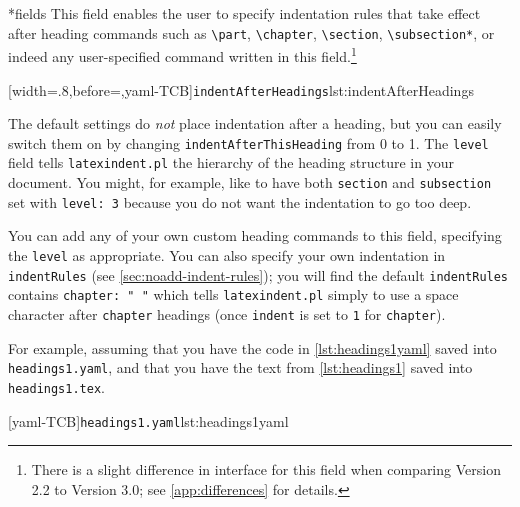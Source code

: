 *{fields}
	This field enables the user to specify indentation rules that take effect after heading
	commands such as \lstinline!\part!, \lstinline!\chapter!,
	\lstinline!\section!, \lstinline!\subsection*!, or indeed any user-specified command
	written in this field.\footnote{There is a slight difference in interface for this field
		when comparing Version 2.2 to Version 3.0; see \vref{app:differences} for details.}

	[width=.8\linewidth,before=\centering,yaml-TCB]{\texttt{indentAfterHeadings}}{lst:indentAfterHeadings}

	The default settings do \emph{not} place indentation after a heading, but you can easily
	switch them on by changing \texttt{indentAfterThisHeading} from 0 to 1. The
	\texttt{level} field tells \texttt{latexindent.pl} the hierarchy of the heading structure
	in your document. You might, for example, like to have both \texttt{section} and
	\texttt{subsection} set with \texttt{level: 3} because you do not want the indentation to
	go too deep.

	You can add any of your own custom heading commands to this field, specifying the
	\texttt{level} as appropriate. You can also specify your own indentation in
	\texttt{indentRules} (see \vref{sec:noadd-indent-rules}); you will find the default
	\texttt{indentRules} contains
	\lstinline!chapter: " "! which tells \texttt{latexindent.pl} simply to use a space
	character after \texttt{chapter} headings (once \texttt{indent} is set to \texttt{1} for
	\texttt{chapter}).

	For example, assuming that you have the code in \cref{lst:headings1yaml} saved into
	\texttt{headings1.yaml}, and that you have the text from \cref{lst:headings1} saved into
	\texttt{headings1.tex}.

	\begin{cmhtcbraster}
		[yaml-TCB]{\texttt{headings1.yaml}}{lst:headings1yaml}
	\end{cmhtcbraster}

